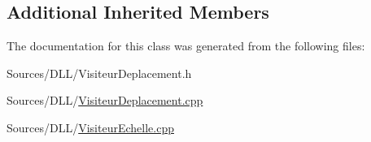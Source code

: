 \subsection*{Additional Inherited Members}


The documentation for this class was generated from the following files\+:\begin{DoxyCompactItemize}
\item 
Sources/\+D\+L\+L/Visiteur\+Deplacement.\+h\item 
Sources/\+D\+L\+L/\hyperlink{_visiteur_deplacement_8cpp}{Visiteur\+Deplacement.\+cpp}\item 
Sources/\+D\+L\+L/\hyperlink{_visiteur_echelle_8cpp}{Visiteur\+Echelle.\+cpp}\end{DoxyCompactItemize}
